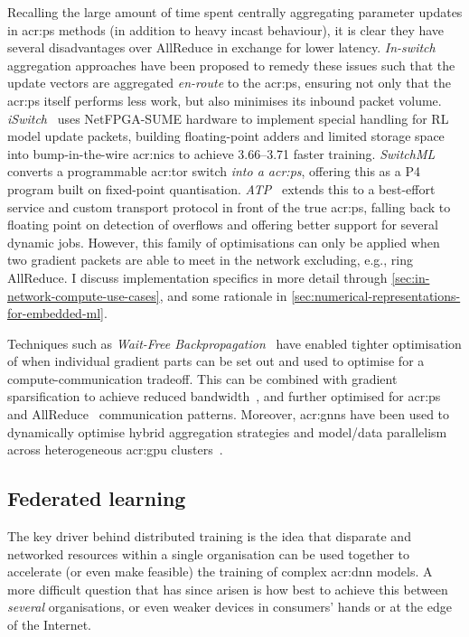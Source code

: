 Recalling the large amount of time spent centrally aggregating parameter updates in \gls{acr:ps} methods (in addition to heavy incast behaviour), it is clear they have several disadvantages over AllReduce in exchange for lower latency.
\emph{In-switch} aggregation approaches have been proposed to remedy these issues such that the update vectors are aggregated \emph{en-route} to the \gls{acr:ps}, ensuring not only that the \gls{acr:ps} itself performs less work, but also minimises its inbound packet volume.
\emph{iSwitch}~\parencite{DBLP:conf/isca/LiLYCSH19} uses NetFPGA-SUME hardware to implement special handling for RL model update packets, building floating-point adders and limited storage space into bump-in-the-wire \glspl{acr:nic} to achieve \qtyrange{3.66}{3.71}{\times} faster training.
\emph{SwitchML}~\parencite{DBLP:conf/nsdi/SapioC0NKKKMPR21} converts a programmable \gls{acr:tor} switch \emph{into a \gls{acr:ps}}, offering this as a P4 program built on fixed-point quantisation.
\emph{ATP}~\parencite{DBLP:conf/nsdi/LaoLMCWAS21} extends this to a best-effort service and custom transport protocol in front of the true \gls{acr:ps}, falling back to floating point on detection of overflows and offering better support for several dynamic jobs.
However, this family of optimisations can only be applied when two gradient packets are able to meet in the network excluding, e.g., ring AllReduce.
I discuss implementation specifics in more detail through \cref{sec:in-network-compute-use-cases}, and some rationale in \cref{sec:numerical-representations-for-embedded-ml}.

Techniques such as \emph{Wait-Free Backpropagation}~\parencite{DBLP:conf/usenix/ZhangZXDHLHWXX17,DBLP:conf/ppopp/AwanHHP17} have enabled tighter optimisation of when individual gradient parts can be set out and used to optimise for a compute-communication tradeoff.
This can be combined with gradient sparsification to achieve reduced bandwidth~\parencite{DBLP:conf/infocom/ShiWCLQLZ20}, and further optimised for \gls{acr:ps}~\parencite{DBLP:conf/infocom/WangLG20} and AllReduce~\parencite{DBLP:conf/infocom/BaoPCW20} communication patterns.
Moreover, \glspl{acr:gnn} have been used to dynamically optimise hybrid aggregation strategies and model/data parallelism across heterogeneous \gls{acr:gpu} clusters~\parencite{DBLP:conf/conext/0001ZLLDWZYL20}.

\subsection{Federated learning}
The key driver behind distributed training is the idea that disparate and networked resources within a single organisation can be used together to accelerate (or even make feasible) the training of complex \gls{acr:dnn} models.
A more difficult question that has since arisen is how best to achieve this between \emph{several} organisations, or even weaker devices in consumers' hands or at the edge of the Internet.

